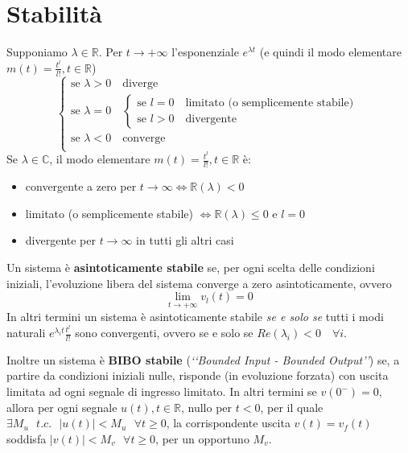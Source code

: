 \documentclass[a4paper, titlepage, oneside]{scrbook}
\begin{document}
\section{Stabilità}
Supponiamo $\lambda \in \mathbb{R}$. Per $t\rightarrow+\infty$ l'esponenziale $e^{\lambda t}$ (e quindi il modo elementare $m(t)=\frac{t^l}{l!},t\in \mathbb{R}$)
\begin{equation*}
	\begin{cases}
		\text{se } \lambda > 0 \quad \text{diverge}\\
		\text{se } \lambda = 0 \quad
			\begin{cases}
				\text{se } l = 0 \quad \text{limitato (o semplicemente stabile)}\\
				\text{se } l > 0 \quad \text{divergente}
			\end{cases}\\
		\text{se } \lambda < 0 \quad \text{converge}\\
	\end{cases}
\end{equation*}
Se $\lambda \in \mathbb{C}$, il modo elementare $m(t)=\frac{t^l}{l!},t\in \mathbb{R}$ è:
\begin{itemize}
	\item convergente a zero per $t \rightarrow \infty \iff \mathbb{R}(\lambda) < 0$
	\item limitato (o semplicemente stabile) $\iff \mathbb{R}(\lambda)\leq0$ e $l=0$
	\item divergente per $t\rightarrow \infty$ in tutti gli altri casi
\end{itemize}
Un sistema è \textbf{asintoticamente stabile} se, per ogni scelta delle condizioni iniziali, l'evoluzione libera del sistema converge a zero asintoticamente, ovvero
$$ \lim_{t\rightarrow+\infty} v_l(t)=0 $$
In altri termini un sistema è asintoticamente stabile \textit{se e solo se} tutti i modi naturali $e^{\lambda_it}\frac{t^l}{l!}$ sono convergenti, ovvero se e solo se
$Re(\lambda_i)<0 \quad \forall i$.

Inoltre un sistema è \textbf{BIBO stabile} (\textit{‘‘Bounded Input - Bounded Output’’}) se, a partire da condizioni iniziali nulle, risponde (in evoluzione forzata)
con uscita limitata ad ogni segnale di ingresso limitato. In altri termini se $v(0^-)=0$, allora per ogni segnale $u(t), t\in \mathbb{R}$, nullo per $t<0$, per il quale
$\exists M_u \text{ } t.c. \text{ } |u(t)| < M_u \text{ } \forall t \geq 0$, la corrispondente uscita $v(t)=v_f(t)$ soddisfa $|v(t)|<M_v \text{ } \forall t \geq 0$, per un opportuno $M_v$.
\end{document}
